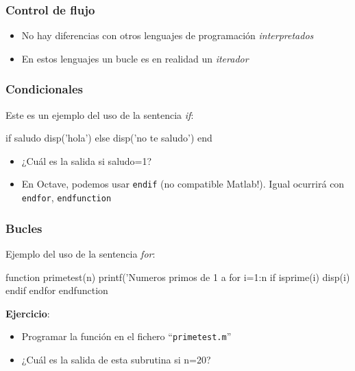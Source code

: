\hypertarget{control-de-flujo}{}
\begin{frame}\frametitle{Control de flujo}
\begin{itemize}
\item {} 
No hay diferencias con otros lenguajes de programación
\emph{interpretados}
\item {} 
En estos lenguajes un bucle es en realidad un \emph{iterador}
\end{itemize}

\end{frame}


\hypertarget{condicionales}{}
\begin{frame}[containsverbatim]
\frametitle{Condicionales}

Este es un ejemplo del uso de la sentencia \emph{if}:
\begin{Octave}
if saludo 
  disp('hola') 
else 
  disp('no te saludo') 
end
\end{Octave}

\begin{itemize}
\item 
  ¿Cuál es la salida si saludo=1?
\item 
  En Octave, podemos usar \texttt{endif} (no compatible Matlab!).
  Igual ocurrirá con \texttt{endfor}, \texttt{endfunction}
\end{itemize}
\end{frame}


\hypertarget{bucles}{}
\begin{frame}[containsverbatim]
\frametitle{Bucles}

Ejemplo del uso de la sentencia \emph{for}:
\begin{Octave}
function primetest(n) 
  printf('Numeros primos de 1 a %
  for i=1:n 
    if isprime(i) 
      disp(i) 
    endif
  endfor
endfunction
\end{Octave}
\textbf{Ejercicio}:
\begin{itemize}
\item Programar la función en el fichero
  ``\texttt{primetest.m}''
\item 
  ¿Cuál es la salida de esta subrutina si n=20?
\end{itemize}
\end{frame}

